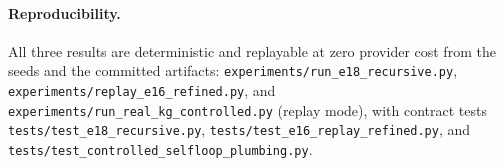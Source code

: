 \documentclass[11pt]{article}
\theoremstyle{plain}
\begin{document}
\paragraph{Reproducibility.}
All three results are deterministic and replayable at zero provider cost
from the seeds and the committed artifacts:
\texttt{experiments/run\_e18\_recursive.py},
\texttt{experiments/replay\_e16\_refined.py}, and
\texttt{experiments/run\_real\_kg\_controlled.py} (replay mode), with
contract tests \texttt{tests/test\_e18\_recursive.py},
\texttt{tests/test\_e16\_replay\_refined.py}, and
\texttt{tests/test\_controlled\_selfloop\_plumbing.py}.
\end{document}
